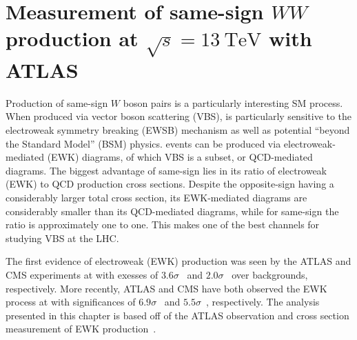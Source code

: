 \chapter[Measurement of same-sign $WW$ production at $\sqrt{s} = 13~\mathrm{TeV}$ with ATLAS][Measurement of same-sign $WW$ production at $\sqrt{s} = 13~\mathrm{TeV}$ with ATLAS]{Measurement of same-sign $WW$ production at $\sqrt{s} = 13~\mathrm{TeV}$ with ATLAS}
\label{ch:ssww13tev}

Production of same-sign $W$ boson pairs is a particularly interesting SM process.
When produced via vector boson scattering (VBS), \ssww is particularly sensitive to the electroweak symmetry breaking (EWSB) mechanism as well as potential ``beyond the Standard Model'' (BSM) physics.
\ssww events can be produced via electroweak-mediated (EWK) diagrams, of which VBS is a subset, or QCD-mediated diagrams. 
The biggest advantage of same-sign \ssww lies in its ratio of electroweak (EWK) to QCD production cross sections.
Despite the opposite-sign \osww having a considerably larger total cross section, its EWK-mediated diagrams are considerably smaller than its QCD-mediated diagrams, while for same-sign \sswwnojj the ratio is approximately one to one.
This makes \ssww one of the best channels for studying VBS at the LHC.

The first evidence of electroweak (EWK) \ssww production was seen by the ATLAS and CMS experiments at  with exesses of $3.6\sigma$~\cite{2014.ssww-8tev-atlas} and $2.0\sigma$~\cite{2015-ssww-8tev-cms} over backgrounds, respectively.
More recently, ATLAS and CMS have both observed the EWK process at  with significances of $6.9\sigma$~\cite{2018.ssww-13tev-atlas-conf} and $5.5\sigma$~\cite{2017.ssww-13tev-cms}, respectively.
The analysis presented in this chapter is based off of the ATLAS  observation and cross section measurement of EWK \ssww production~\cite{2018.ssww-13tev-atlas-conf, 2018.ssww-13tev-atlas-support}.




